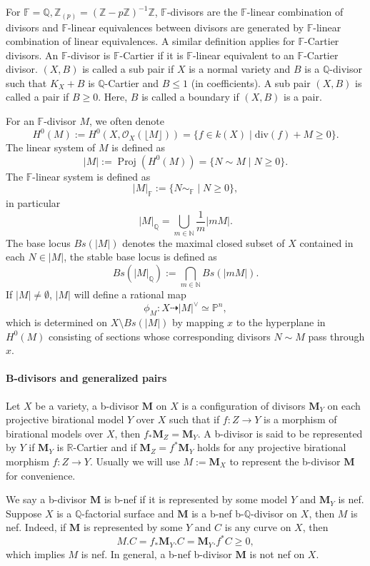 \documentclass[letterpaper,reqno,12pt]{amsart}
\DeclareMathOperator{\Proj}{Proj}
\newcommand{\tbf}{\textbf}
\numberwithin{equation}{section}
\theoremstyle{plain}
\begin{document}
For $\mathbb F=\mathbb Q,\mathbb Z_{(p)}=(\mathbb Z-p\mathbb Z)^{-1}\mathbb Z$, $\mathbb F$-divisors are the $\mathbb F$-linear combination of divisors and $\mathbb F$-linear equivalences between divisors are generated by $\mathbb F$-linear combination of linear equivalences. A similar definition applies for $\mathbb F$-Cartier divisors. An $\mathbb F$-divisor is $\mathbb F$-Cartier if it is $\mathbb F$-linear equivalent to an $\mathbb F$-Cartier divisor. $(X,B)$ is called a sub pair if $X$ is a normal variety and $B$ is a $\mathbb Q$-divisor such that $K_X+B$ is $\mathbb Q$-Cartier and $B\leq 1$ (in coefficients).  A sub pair $(X,B)$ is called a pair if $B\geq 0$. Here, $B$ is called a boundary if $(X,B)$ is a pair.

For an $\mathbb F$-divisor $M$, we often denote \[H^0(M):=H^0(X,\mathcal O_X(\lfloor M\rfloor))=\{f\in k(X)\mid\text{div}(f)+M\geq 0\}.\] The linear system of $M$ is defined as  \[|M|:=\Proj(H^0(M))=\{N\sim M\mid N\geq0\}.\] The $\mathbb F$-linear system is defined as \[|M|_{\mathbb F}:=\{N\sim_{\mathbb F}\mid N\geq0\},\]in particular \[|M|_{\mathbb Q}=\bigcup\limits_{m\in\mathbb N} \frac{1}{m}|mM|.\]The base locus $Bs(|M|)$ denotes the maximal closed subset of $X$ contained in each $N\in|M|$, the stable base locus is defined as \[Bs(|M|_{\mathbb Q}):=\bigcap\limits_{m\in\mathbb N} Bs(|mM|).\] If $|M|\neq\emptyset$, $|M|$ will define a rational map \[\phi_M:X\dashrightarrow |M|^\lor\simeq \mathbb P^n,\] which is determined on $X\setminus Bs(|M|)$ by mapping $x$ to the hyperplane in $H^0(M)$ consisting of sections whose corresponding divisors $N\sim M$ pass through $x$. 

\paragraph{\tbf{B-divisors and generalized pairs}}

Let $X$ be a variety, a b-divisor $\mathbf M$ on $X$ is a configuration of divisors $\mathbf M_Y$ on each projective birational model $Y$ over $X$ such that if $f:Z\to Y$ is a morphism of birational models over $X$, then $f_*\mathbf M_Z=\mathbf M_Y$. A b-divisor is said to be represented by $Y$ if $\mathbf M_Y$ is $\mathbb R$-Cartier and if $\mathbf M_Z=f^*\mathbf M_Y$ holds for any projective birational morphism $f:Z\to Y$. Usually we will use $M:=\mathbf M_X$ to represent the b-divisor $\mathbf M$ for convenience.

We say a b-divisor $\mathbf M$ is b-nef if it is represented by some model $Y$ and $\mathbf M_Y$ is nef. Suppose $X$ is a $\mathbb Q$-factorial surface and $\mathbf M$ is a b-nef b-$\mathbb Q$-divisor on $X$, then $M$ is nef. Indeed, if $\mathbf M$ is represented by some $Y$ and $C$ is any curve on $X$, then \[M.C=f_*\mathbf M_Y.C=\mathbf M_Y.f^*C\geq0,\] which implies $M$ is nef. In general, a b-nef b-divisor $\mathbf M$ is not nef on $X$.
\end{document}
